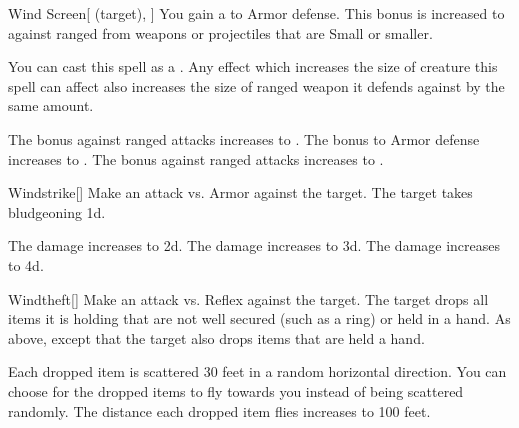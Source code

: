 \lowercase{\hypertarget{spell:Wind Screen}{}}\label{spell:Wind Screen}
\begin{attuneability}[Rank 1]{\hypertarget{spell:Wind Screen}{Wind Screen}}[ (target), ]
You gain a   to Armor defense.
This bonus is increased to  against ranged  from weapons or projectiles that are Small or smaller.

You can cast this spell as a .
Any effect which increases the size of creature this spell can affect also increases the size of ranged weapon it defends against by the same amount.

\rankline
{} The bonus against ranged attacks increases to .
 The bonus to Armor defense increases to .
 The bonus against ranged attacks increases to .
\end{attuneability}
\vspace{0.25em}



\lowercase{\hypertarget{spell:Windstrike}{}}\label{spell:Windstrike}
\begin{freeability}[Rank 1]{\hypertarget{spell:Windstrike}{Windstrike}}[]
Make an attack vs. Armor against the target.
\hit The target takes bludgeoning  \plus1d.

\rankline
{} The damage increases to  \plus2d.
 The damage increases to  \plus3d.
 The damage increases to  \plus4d.
\end{freeability}
\vspace{0.25em}



\lowercase{\hypertarget{spell:Windtheft}{}}\label{spell:Windtheft}
\begin{freeability}[Rank 1]{\hypertarget{spell:Windtheft}{Windtheft}}[]
Make an attack vs. Reflex against the target.
\hit The target drops all items it is holding that are not well secured (such as a ring) or held in a hand.
\crit As above, except that the target also drops items that are held a hand.

\rankline
{} Each dropped item is scattered 30 feet in a random horizontal direction.
 You can choose for the dropped items to fly towards you instead of being scattered randomly.
 The distance each dropped item flies increases to 100 feet.
\end{freeability}
\vspace{0.25em}



